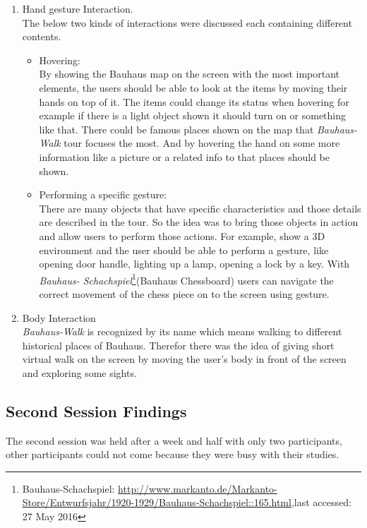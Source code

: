 \begin {enumerate}
\item   Hand gesture Interaction. \\
The below two kinds of interactions were discussed each containing different contents. 

\begin {itemize}
\item   Hovering: \\
By showing the Bauhaus map on the screen with the most important elements, the users should be able to look at the items by moving their hands on top of it. The items could change its status when hovering for example if there is a light object shown it should turn on or something like that.
There could be famous places shown on the map that \emph{Bauhaus-Walk} tour focuses the most. And by hovering the hand on some more information like a picture or a related info to that places should be shown.

\item   Performing a specific gesture:\\
There are many objects that have specific characteristics and those details are described in the tour. So the idea was to bring those objects in action and allow users to perform those actions. For example, show a 3D environment and the user should be able to perform a gesture, like opening door handle, lighting up a lamp, opening a lock by a key. With \emph{Bauhaus- Schachspiel}\footnote{Bauhaus-Schachspiel: \url{http://www.markanto.de/Markanto-Store/Entwurfsjahr/1920-1929/Bauhaus-Schachspiel::165.html},last accessed: 27 May 2016 }(Bauhaus Chessboard) users can navigate the correct movement of the chess piece on to the screen using gesture.
\end{itemize}


\item	Body Interaction  \\
\emph{Bauhaus-Walk} is recognized by its name which means walking to different historical places of Bauhaus. Therefor there was the idea of giving short virtual walk on the screen by moving the user's body in front of the screen and exploring some sights.

\end{enumerate}


\subsection{Second Session Findings}
The second session was held after a week and half with only two participants, other participants could not come because they were busy with their studies. 

